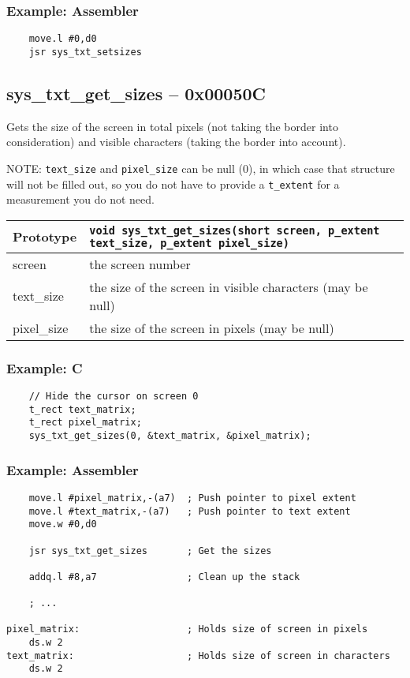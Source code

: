 \subsubsection*{Example: Assembler}
\begin{verbatim}
    move.l #0,d0
    jsr sys_txt_setsizes
\end{verbatim}

\subsection*{sys\_txt\_get\_sizes -- 0x00050C}
Gets the size of the screen in total pixels (not taking the border into consideration) and visible characters (taking the border into account).

NOTE: \verb+text_size+ and \verb+pixel_size+ can be null (0), in which case that structure will not be filled out,
so you do not have to provide a \verb+t_extent+ for a measurement you do not need.

\begin{tabular}{|l||l|} \hline
Prototype & \lstinline!void sys_txt_get_sizes(short screen, p_extent text_size, p_extent pixel_size)! \\ \hline
screen & the screen number  \\ \hline
text\_size & the size of the screen in visible characters (may be null) \\ \hline
pixel\_size & the size of the screen in pixels (may be null) \\ \hline
\end{tabular}

\subsubsection*{Example: C}
\begin{lstlisting}
    // Hide the cursor on screen 0
    t_rect text_matrix;
    t_rect pixel_matrix;
    sys_txt_get_sizes(0, &text_matrix, &pixel_matrix);    
\end{lstlisting}

\subsubsection*{Example: Assembler}
\begin{verbatim}
    move.l #pixel_matrix,-(a7)  ; Push pointer to pixel extent
    move.l #text_matrix,-(a7)   ; Push pointer to text extent
    move.w #0,d0

    jsr sys_txt_get_sizes       ; Get the sizes

    addq.l #8,a7                ; Clean up the stack

    ; ...

pixel_matrix:                   ; Holds size of screen in pixels
    ds.w 2
text_matrix:                    ; Holds size of screen in characters
    ds.w 2
\end{verbatim}


